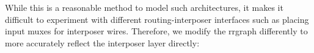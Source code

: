 \documentclass{sig-alternate-2013}
\begin{document}
While this is a reasonable method to model such architectures, it makes it difficult to experiment with different routing-interposer interfaces such as placing input muxes for interposer wires. Therefore, we modify the rrgraph differently to more accurately reflect the interposer layer directly:

\begin{figure}[!t]

\end{figure}
\end{document}
